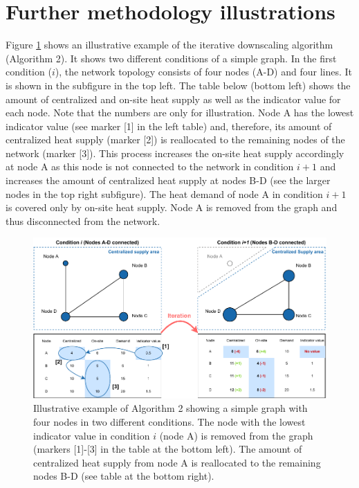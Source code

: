 \documentclass[review]{elsarticle}
\begin{document}
\section{Further methodology illustrations}\label{appendixB}
Figure \ref{fig:app:method} shows an illustrative example of the iterative downscaling algorithm (Algorithm 2). It shows two different conditions of a simple graph. In the first condition ($i$), the network topology consists of four nodes (A-D) and four lines. It is shown in the subfigure in the top left. The table below (bottom left) shows the amount of centralized and on-site heat supply as well as the indicator value for each node. Note that the numbers are only for illustration. Node A has the lowest indicator value (see marker [1] in the left table) and, therefore, its amount of centralized heat supply (marker [2]) is reallocated to the remaining nodes of the network (marker [3]). This process increases the on-site heat supply accordingly at node A as this node is not connected to the network in condition $i+1$ and increases the amount of centralized heat supply at nodes B-D (see the larger nodes in the top right subfigure). The heat demand of node A in condition $i+1$ is covered only by on-site heat supply. Node A is removed from the graph and thus disconnected from the network.

\begin{figure}[h]
	\centering
	\includegraphics[width=1\linewidth]{figures/_appendix/Method_appendix.pdf}
	\caption{Illustrative example of Algorithm 2 showing a simple graph with four nodes in two different conditions. The node with the lowest indicator value in condition $i$ (node A) is removed from the graph (markers [1]-[3] in the table at the bottom left). The amount of centralized heat supply from node A is reallocated to the remaining nodes B-D (see table at the bottom right).}
	\label{fig:app:method}
\end{figure}
\end{document}
